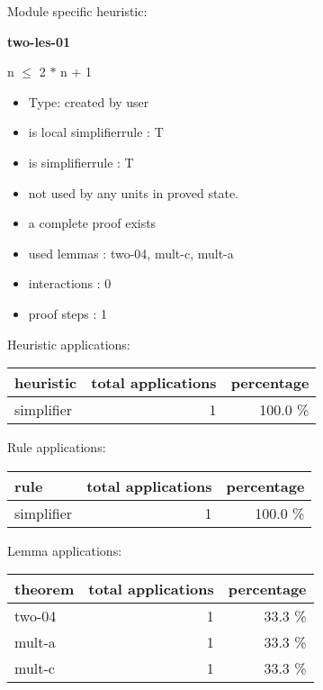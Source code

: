 \documentclass[a4paper]{article}
\begin{document}
Module specific heuristic:

\pagebreak

{\LARGE\bf two-les-01}\label{lemma-two-les-01}

\medskip

 \Fol n $\le$ 2 $*$ n + 1

\begin{itemize}

\item Type: created by user

\item is local simplifierrule : T
\item is simplifierrule : T
\item not used by any units in proved state.
\item       a complete proof exists
\item       used lemmas  : two-04, mult-c, mult-a
\item       interactions : 0
\item       proof steps  : 1
\end{itemize}

\medskip


Heuristic applications:

\begin{supertabular}{l|r|r}
heuristic	& total applications & percentage \\ \hline
simplifier & 1 & 100.0 \% \\

\end{supertabular}

Rule applications:

\begin{supertabular}{l|r|r}
rule	        & total applications & percentage \\ \hline
simplifier & 1 & 100.0 \% \\

\end{supertabular}

Lemma applications:

\begin{supertabular}{l|r|r}
theorem	        & total applications & percentage \\ \hline
two-04 & 1 & 33.3 \% \\
mult-a & 1 & 33.3 \% \\
mult-c & 1 & 33.3 \% \\

\end{supertabular}
\end{document}
